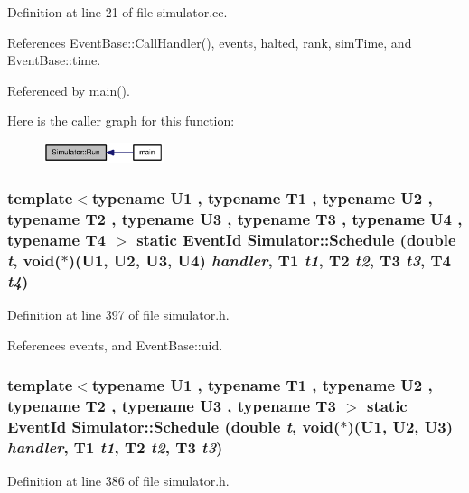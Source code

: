 Definition at line 21 of file simulator.cc.

References EventBase::CallHandler(), events, halted, rank, simTime, and EventBase::time.

Referenced by main().

Here is the caller graph for this function:\nopagebreak
\begin{figure}[H]
\begin{center}
\leavevmode
\includegraphics[width=100pt]{classSimulator_27e7045e7aa4e29e9d2003aaa09c8326_icgraph}
\end{center}
\end{figure}
\subsubsection[{Schedule}]{\setlength{\rightskip}{0pt plus 5cm}template$<$typename U1 , typename T1 , typename U2 , typename T2 , typename U3 , typename T3 , typename U4 , typename T4 $>$ static {\bf EventId} Simulator::Schedule (double {\em t}, \/  void($\ast$)(U1, U2, U3, U4) {\em handler}, \/  T1 {\em t1}, \/  T2 {\em t2}, \/  T3 {\em t3}, \/  T4 {\em t4})\hspace{0.3cm}{\tt  [inline, static]}}\label{classSimulator_a94a8a5c64b661ad4607517d84c8832e}




Definition at line 397 of file simulator.h.

References events, and EventBase::uid.
\subsubsection[{Schedule}]{\setlength{\rightskip}{0pt plus 5cm}template$<$typename U1 , typename T1 , typename U2 , typename T2 , typename U3 , typename T3 $>$ static {\bf EventId} Simulator::Schedule (double {\em t}, \/  void($\ast$)(U1, U2, U3) {\em handler}, \/  T1 {\em t1}, \/  T2 {\em t2}, \/  T3 {\em t3})\hspace{0.3cm}{\tt  [inline, static]}}\label{classSimulator_2bc6f517e3b3a284b6b52efc47a9da76}




Definition at line 386 of file simulator.h.

